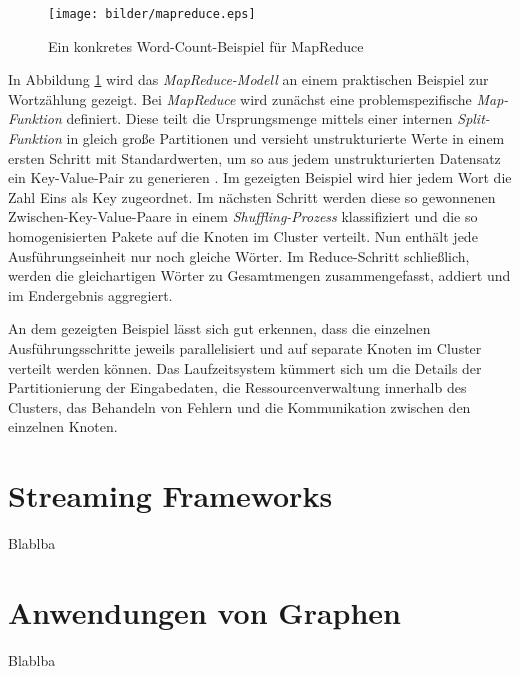 \begin{figure}[htb!]
\centering
\texttt{[image: bilder/mapreduce.eps]}
\caption{Ein konkretes Word-Count-Beispiel für MapReduce}
\label{fig:wordcount}
\end{figure}   
 


In Abbildung \ref{fig:wordcount} wird das \textit{MapReduce-Modell} an einem praktischen Beispiel zur Wortzählung gezeigt. Bei \textit{MapReduce} wird zunächst eine problemspezifische \textit{Map-Funktion} definiert. Diese teilt die Ursprungsmenge mittels einer internen \textit{Split-Funktion} in gleich große Partitionen und versieht unstrukturierte Werte in einem ersten Schritt mit Standardwerten, um so aus jedem unstrukturierten Datensatz ein Key-Value-Pair zu generieren . Im gezeigten Beispiel wird hier jedem Wort die Zahl Eins als Key zugeordnet. Im nächsten Schritt werden diese so gewonnenen Zwischen-Key-Value-Paare in einem \textit{Shuffling-Prozess} klassifiziert und die so homogenisierten Pakete auf die Knoten im Cluster verteilt. Nun enthält jede Ausführungseinheit nur noch gleiche Wörter. Im Reduce-Schritt schließlich, werden die gleichartigen Wörter zu Gesamtmengen zusammengefasst, addiert und im Endergebnis aggregiert. 

An dem gezeigten Beispiel lässt sich gut erkennen, dass die einzelnen Ausführungsschritte jeweils parallelisiert und auf separate Knoten im Cluster verteilt werden können. Das Laufzeitsystem kümmert sich um die Details der Partitionierung der Eingabedaten, die Ressourcenverwaltung innerhalb des Clusters, das Behandeln von Fehlern und die Kommunikation zwischen den einzelnen Knoten. 
 

\section{Streaming Frameworks}
\label{section:streaming framworks}

Blablba

\section{Anwendungen von Graphen}
\label{section:anwendungen von graphen}

Blablba